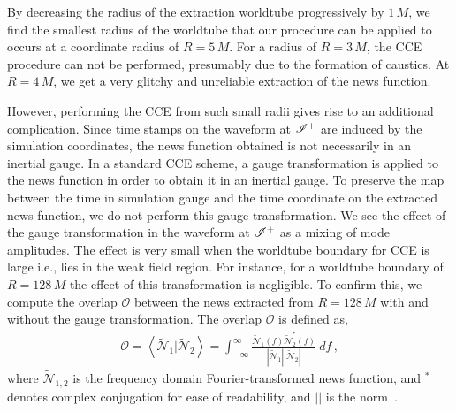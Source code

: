 By decreasing the radius of the extraction worldtube progressively by $1\,M$, we find the smallest radius of the worldtube that our procedure can be applied to occurs at a coordinate radius of $R= 5\,M$. For a radius of $R=3\,M$, the CCE procedure can not be performed, presumably due to the formation of caustics. At $R=4\,M$, we get a very glitchy and unreliable extraction of the news function. 

However, performing the CCE from such small radii gives rise to an additional complication. Since time stamps on the waveform at $\mathscr{I^+}$ are induced by the simulation coordinates, the news function obtained is not necessarily in an inertial gauge. In a standard CCE scheme, a gauge transformation is applied to the news function in order to obtain it in an inertial gauge.  To preserve the map between the time in simulation gauge and the time coordinate on the extracted news function, we do not perform this gauge transformation. We see the effect of the gauge transformation in the waveform at $\mathscr{I^+}$ as a mixing of mode amplitudes. The effect is very small when the worldtube boundary for CCE is large i.e., lies in the weak field region. For instance, for a worldtube boundary of $R=128\,M$ the effect of this transformation is negligible. To confirm this, we compute the overlap $\mathcal{O}$ between the news extracted from $R=128\,M$ with and without the gauge transformation. The overlap $\mathcal{O}$ is defined as, 
\begin{align}
\label{eq:overlap}
\mathcal{O} = \left\langle \mathcal{\widetilde{N}}_{1} | \mathcal{\widetilde{N}}_{2}\right\rangle = \int_{- \infty}^{\infty} \frac{\mathcal{\widetilde{N}}_{1}(f) \mathcal{{\widetilde{N}}}_{2}^{*} (f)}{|\mathcal{\widetilde{N}}_{1}||\mathcal{\widetilde{N}}_{2}|}~df\,,
\end{align}
where $\mathcal{\widetilde{N}}_{1,2}$ is the frequency domain Fourier-transformed news function, and ${}^*$ denotes complex conjugation for ease of readability, and $||$ is the norm~\cite{overlap}. 

